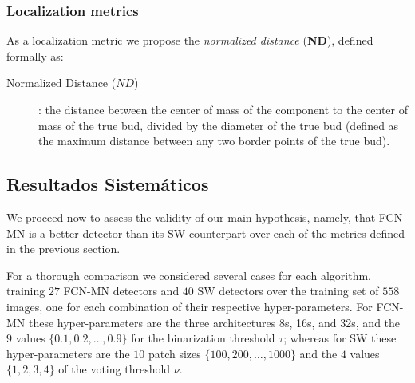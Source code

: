 \documentclass[a4paper,authoryear,review]{elsarticle}
\begin{document}


\subsubsection{Localization metrics} \label{subsec:locmetrics}

As a localization metric we propose the \emph{normalized distance} (\textbf{ND}), defined formally as:

\begin{description}
	\item[Normalized Distance ($ND$)]:  the distance between the center of mass of the component to the center of mass of the true bud, divided by the diameter of the true bud (defined as the maximum distance between any two border points of the true bud).
\end{description}



\subsection{Resultados Sistemáticos}   \label{sec:resultados}

We proceed now to assess the validity of our main hypothesis, namely, that FCN-MN is a better detector than its SW counterpart over each of the metrics defined in the previous section. 

For a thorough comparison we considered several cases for each algorithm, training $27$ FCN-MN detectors and $40$ SW detectors over the training set of $558$ images, one for each combination of their respective hyper-parameters. For FCN-MN these hyper-parameters are the three architectures 8s, 16s, and 32s, and the $9$ values $\{0.1, 0.2, \ldots, 0.9\}$ for the binarization threshold $\tau$; whereas for SW these hyper-parameters are the $10$ patch sizes $\{100, 200, \ldots, 1000\}$  and the $4$ values $\{1, 2, 3, 4\}$  of the voting threshold $\nu$.
\end{document}
